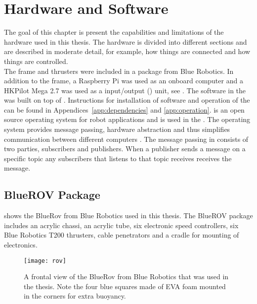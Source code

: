 \chapter{Hardware and Software}\label{cha:hardware}
The goal of this chapter is present the capabilities and limitations of the hardware used in this thesis. The hardware is divided into different sections and are described in moderate detail, for example, how things are connected and how things are controlled.\\
The \abbrROV frame and thrusters were included in a package from Blue Robotics. In addition to the \abbrROV frame, a Raspberry Pi was used as an onboard computer and a HKPilot Mega 2.7  was used as a input/output (\abbrIO) unit, see . The software in the \abbrROV was built on top of \abbrROS.  Instructions for installation of software and operation of the \abbrROV can be found in Appendices~\ref{app:dependencies} and \ref{app:operation}. \abbrROS is an open source operating system for robot applications and is used in the \abbrROV. The operating system provides message passing, hardware abstraction and thus simplifies communication between different computers \citep{ROS}. The message passing in \abbrROS consists of two parties, subscribers and publishers. When a publisher sends a message on a specific topic any subscribers that listens to that topic receives receives the message.  
\section{BlueROV Package}
 shows the BlueRov from Blue Robotics used in this thesis. The BlueROV package includes an acrylic chassi, an acrylic tube, six electronic speed controllers, six Blue Robotics T200 thrusters, cable penetrators and a cradle for mounting of electronics.
\begin{figure}
\centering
\texttt{[image: rov]}
\caption{A frontal view of the BlueRov from Blue Robotics that was used in the thesis.
Note the four blue squares made of EVA foam mounted in the corners for extra buoyancy.}
\label{fig:rov}
\end{figure}

